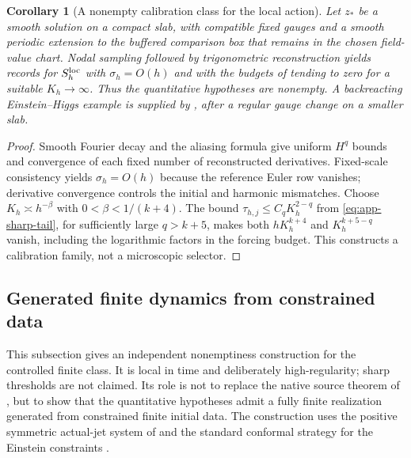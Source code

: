 \documentclass[11pt]{article}
\numberwithin{equation}{section}
\newtheorem{corollary}[corollary]{Corollary}
\theoremstyle{definition}
\theoremstyle{remark}
\begin{document}
\begin{corollary}[A nonempty calibration class for the local action]
\label{cor:local-calibration-nonempty}
Let $z_*$ be a smooth solution on a compact slab, with compatible fixed
gauges and a smooth periodic extension to the buffered comparison box that
remains in the chosen field-value chart.  Nodal sampling followed by
trigonometric reconstruction yields records for $S_h^{\rm loc}$ with
$\sigma_h=O(h)$ and with the budgets of  tending
to zero for a suitable $K_h\to\infty$.  Thus the quantitative hypotheses
are nonempty.  A backreacting Einstein--Higgs example is supplied by
, after a regular gauge change on a smaller slab.
\end{corollary}
\begin{proof}
Smooth Fourier decay and the aliasing formula give uniform $H^q$ bounds
and convergence of each fixed number of reconstructed derivatives.
Fixed-scale consistency yields $\sigma_h=O(h)$ because the reference Euler
row vanishes; derivative convergence controls the initial and harmonic
mismatches. Choose $K_h\asymp h^{-\beta}$ with
$0<\beta<1/(k+4)$. The bound
$\tau_{h,j}\le C_qK_h^{2-q}$ from \eqref{eq:app-sharp-tail}, for
sufficiently large $q>k+5$, makes both $hK_h^{k+4}$ and
$K_h^{k+5-q}$ vanish, including the logarithmic factors in the forcing
budget. This constructs a calibration family, not a microscopic selector.
\end{proof}

\subsection{Generated finite dynamics from constrained data}
\label{app:generated-dynamics}

This subsection gives an independent nonemptiness construction for the controlled finite class.  It is local in time and deliberately high-regularity; sharp thresholds are not claimed.  Its role is not to replace the native source theorem of , but to show that the quantitative hypotheses admit a fully finite realization generated from constrained finite initial data.  The construction uses the positive symmetric actual-jet system of  and the standard conformal strategy for the Einstein constraints \cite{ChoquetBruhatIsenbergPollack2007,IsenbergMaxwell2021}.
\end{document}
